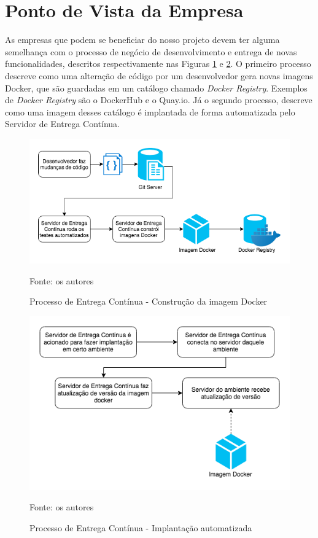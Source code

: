 \documentclass[twosideprint]{politex}
\newcommand{\legend}[1]{\begin{center}\def\caption{}\caption{#1}\end{center}}
\begin{document}
	\section{Ponto de Vista da Empresa}
	    As empresas que podem se beneficiar do nosso projeto devem ter alguma semelhança com o processo de negócio de desenvolvimento e entrega de novas funcionalidades, descritos respectivamente nas Figuras \ref{fig:build-ci} e \ref{fig:automated-deploy}. O primeiro processo descreve como uma alteração de código por um desenvolvedor gera novas imagens Docker, que são guardadas em um catálogo chamado \textit{Docker Registry}. Exemplos de \textit{Docker Registry} são o DockerHub e o Quay.io. Já o segundo processo, descreve como uma imagem desses catálogo é implantada de forma automatizada pelo Servidor de Entrega Contínua.
	    \begin{figure}[htb]
    	    \centering
    	    \caption{Processo de Entrega Contínua - Construção da imagem Docker}
    	    \includegraphics[scale=0.7]{pictures/especificacao-de-requisitos/build-ci.png}
    	    \legend{Fonte: os autores}
    	    \label{fig:build-ci}
	    \end{figure}
	    \begin{figure}[htb]
    	    \centering
    	    \caption{Processo de Entrega Contínua - Implantação automatizada}
    	    \includegraphics[scale=0.7]{pictures/especificacao-de-requisitos/automated-deploy.png}
    	    \legend{Fonte: os autores}
    	    \label{fig:automated-deploy}
	    \end{figure}
\end{document}
